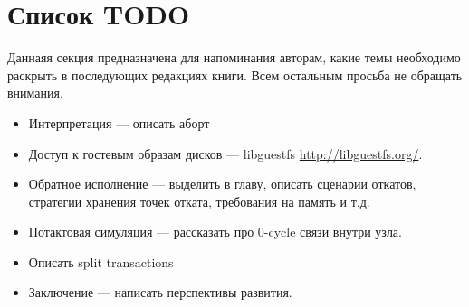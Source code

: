 \section*{Список TODO}

Даннаяя секция предназначена для напоминания авторам, какие темы необходимо раскрыть в последующих редакциях книги. Всем остальным просьба не обращать внимания.

\begin{itemize}
    \item Интерпретация --- описать аборт
    \item Доступ к гостевым образам дисков --- libguestfs \url{http://libguestfs.org/}.
    \item Обратное исполнение --- выделить в главу, описать сценарии откатов, стратегии хранения точек отката, требования на память и т.д.
    \item Потактовая симуляция --- рассказать про 0-cycle связи внутри узла.
    \item Описать split transactions
    \item Заключение --- написать перспективы развития.
\end{itemize}
